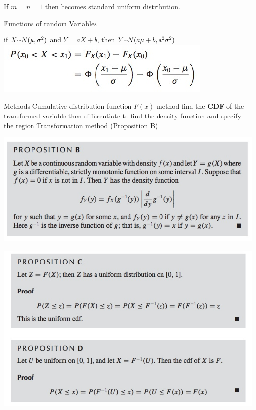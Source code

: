 \documentclass{/out/app/latex/examnotes}
\begin{document}
{\ra If $m=n=1$ then becomes standard uniform distribution.


\disobeylines
{} %
\obeylines


\h{Functions of random Variables}

\vspace{6pt}
if $X\mytilde N(\mu,\sigma^2)$ and $Y=aX+b$, then $Y\mytilde N(a\mu+b,a^2\sigma^2)$
\vspace{6pt}
\includegraphics[scale=0.5]{./img/2stand.jpg}

 Methods
 Cumulative distribution function $F(x)$ method
\rna find the {\bf CDF} of the transformed variable
\rna then differentiate to find the density function
\rna and specify the region
 Transformation method (Proposition B)

\includegraphics[scale=0.6]{./img/2fun1.jpg}

\includegraphics[scale=0.6]{./img/2fun2.jpg}

}
\end{document}
